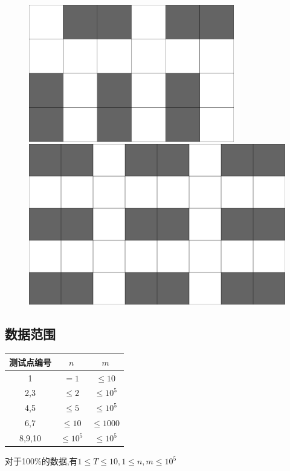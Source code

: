 \documentclass[12pt]{ctexart}
\begin{document}
	\begin{figure}[htbp]
		\centering
		\begin{minipage}[t]{0.49\textwidth}
			\centering
			\includegraphics[width=0.8\textwidth]{pictures/2-4.png}
			\caption{}
		\end{minipage}
		\begin{minipage}[t]{0.49\textwidth}
			\centering
			\includegraphics[width=\textwidth]{pictures/2-5.png}
			\caption{}
		\end{minipage}
	\end{figure}

	\subsection{数据范围}
	\begin{center}
		\begin{tabular}{|c|c|c|}
			\hline 测试点编号&$n$&$m$\\
			\hline 1&$=1$&$\le10$\\
			\hline 2,3&$\le2$&$\le10^5$\\
			\hline 4,5&$\le5$&$\le10^5$\\
			\hline 6,7&$\le10$&$\le1000$\\
			\hline 8,9,10&$\le10^5$&$\le10^5$\\
			\hline
		\end{tabular}
	\end{center}
	对于100\%的数据,有$1\le T\le10,1\le n,m\le10^5$
	\newpage
\end{document}
